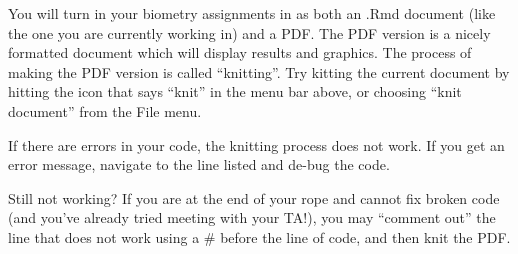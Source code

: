 \documentclass[]{article}
\begin{document}
You will turn in your biometry assignments in as both an .Rmd document
(like the one you are currently working in) and a PDF. The PDF version
is a nicely formatted document which will display results and graphics.
The process of making the PDF version is called ``knitting''. Try
kitting the current document by hitting the icon that says ``knit'' in
the menu bar above, or choosing ``knit document'' from the File menu.

If there are errors in your code, the knitting process does not work. If
you get an error message, navigate to the line listed and de-bug the
code.

Still not working? If you are at the end of your rope and cannot fix
broken code (and you've already tried meeting with your TA!), you may
``comment out'' the line that does not work using a \# before the line
of code, and then knit the PDF.
\end{document}
